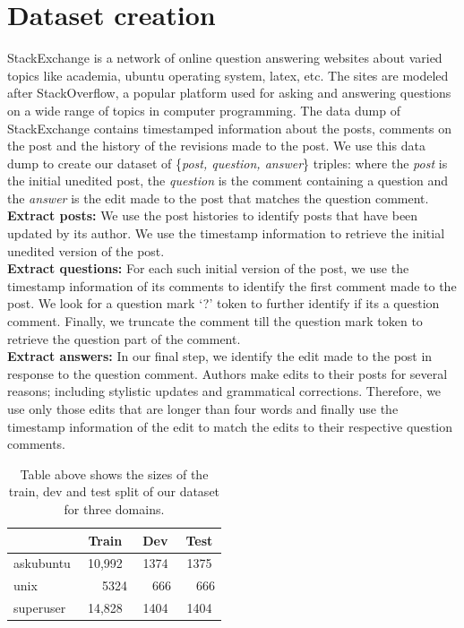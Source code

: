 \documentclass[11pt,a4paper]{article}
\begin{document}
\section{Dataset creation}\label{dataset_creation}
StackExchange is a network of online question answering websites about varied topics like academia, ubuntu operating system, latex, etc. The sites are modeled after StackOverflow, a popular platform used for asking and answering questions on a wide range of topics in computer programming. The data dump of StackExchange contains timestamped information about the posts, comments on the post and the history of the revisions made to the post. We use this data dump to create our dataset of \{\textit{post, question, answer}\} triples: where the \textit{post} is the initial unedited post, the \textit{question} is the comment containing a question and the \textit{answer} is the edit made to the post that matches the question comment. \\
\textbf{Extract posts:} We use the post histories to identify posts that have been updated by its author. We use the timestamp information to retrieve the initial unedited version of the post.\\
\textbf{Extract questions:} For each such initial version of the post, we use the timestamp information of its comments to identify the first comment made to the post. We look for a question mark `?' token to further identify if its a question comment. Finally, we truncate the comment till the question mark token to retrieve the question part of the comment.\\
\textbf{Extract answers:} In our final step, we identify the edit made to the post in response to the question comment. Authors make edits to their posts for several reasons; including stylistic updates and grammatical corrections. Therefore, we use only those edits that are longer than four words and finally use the timestamp information of the edit to match the edits to their respective question comments.

\begin{table}
	\centering
	\begin{tabular}{lccc}
		\toprule
		& Train & Dev & Test  \\
		\midrule
		askubuntu & 10,992 & 1374 & 1375\\
		unix & ~~~5324 & ~~666 & ~~666 \\
		superuser & 14,828 & 1404 & 1404 \\
		\bottomrule
	\end{tabular}
	\label{data_statistics}
	\caption{Table above shows the sizes of the train, dev and test split of our dataset for three domains.}
\end{table}
\end{document}
